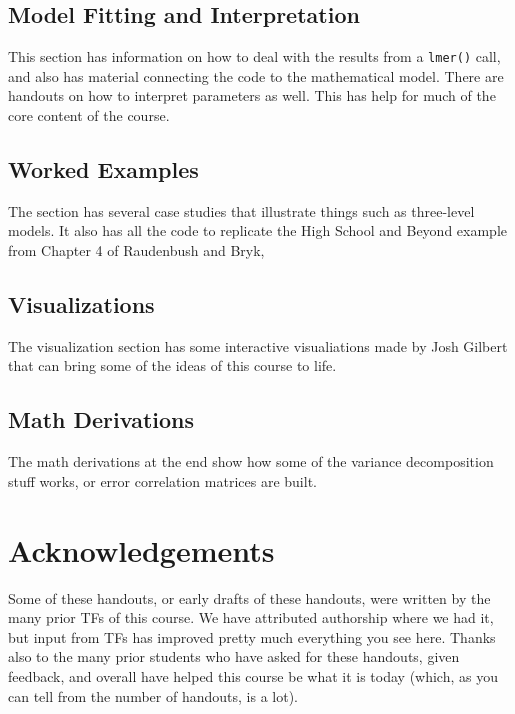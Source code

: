\documentclass[
  letterpaper,
  DIV=11,
  numbers=noendperiod]{scrreprt}
\begin{document}
\subsection*{Model Fitting and
Interpretation}\label{model-fitting-and-interpretation}

This section has information on how to deal with the results from a
\texttt{lmer()} call, and also has material connecting the code to the
mathematical model. There are handouts on how to interpret parameters as
well. This has help for much of the core content of the course.

\subsection*{Worked Examples}\label{worked-examples}

The section has several case studies that illustrate things such as
three-level models. It also has all the code to replicate the High
School and Beyond example from Chapter 4 of Raudenbush and Bryk,

\subsection*{Visualizations}\label{visualizations}

The visualization section has some interactive visualiations made by
Josh Gilbert that can bring some of the ideas of this course to life.

\subsection*{Math Derivations}\label{math-derivations}

The math derivations at the end show how some of the variance
decomposition stuff works, or error correlation matrices are built.

\section*{Acknowledgements}\label{acknowledgements}


Some of these handouts, or early drafts of these handouts, were written
by the many prior TFs of this course. We have attributed authorship
where we had it, but input from TFs has improved pretty much everything
you see here. Thanks also to the many prior students who have asked for
these handouts, given feedback, and overall have helped this course be
what it is today (which, as you can tell from the number of handouts, is
a lot).
\end{document}
